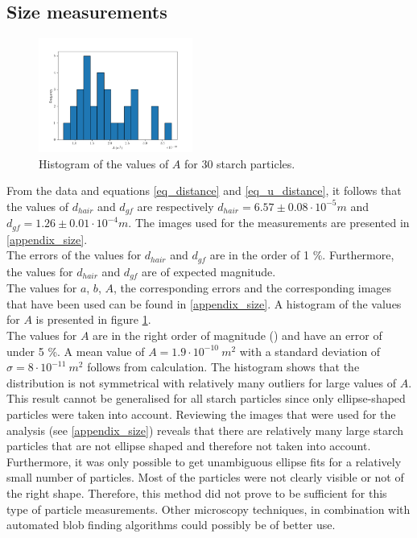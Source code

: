 \subsection{Size measurements}
\begin{figure}
    \centering
    \vspace{-1cm}
    \includegraphics[width=0.45\textwidth,keepaspectratio]{afbeeldingen/histogram_zetmeel.png}
    \caption{Histogram of the values of $A$ for 30 starch particles.}
    \label{fig_histogram_zetmeel}
\end{figure}

From the data and equations \ref{eq_distance} and \ref{eq_u_distance}, it follows that the values of $d_{hair}$ and $d_{gf}$ are respectively $d_{hair} = 6.57 \pm 0.08 \cdot 10^{-5} m $ and $d_{gf} =  1.26 \pm 0.01 \cdot 10^{-4} m $. The images used for the measurements are presented in \ref{appendix_size}.\\
The errors of the values for $d_{hair}$ and $d_{gf}$ are in the order of 1 \%. Furthermore, the values for $d_{hair}$ and $d_{gf}$ are of expected magnitude.\\
The values for $a$, $b$, $A$, the corresponding errors and the corresponding images that have been used can be found in \ref{appendix_size}. A histogram of the values for $A$ is presented in figure \ref{fig_histogram_zetmeel}.\\
The values for $A$ are in the right order of magnitude (\cite{starch}) and have an error of under 5 \%. A mean  value of $A=1.9\cdot10^{-10} \: m^2$ with a standard deviation of $\sigma = 8 \cdot10^{-11} \: m^2$ follows from calculation. The histogram shows that the distribution is not symmetrical with relatively many outliers for large values of $A$. This result cannot be generalised for all starch particles since only ellipse-shaped particles were taken into account. Reviewing the images that were used for the analysis (see \ref{appendix_size}) reveals that there are relatively many large starch particles that are not ellipse shaped and therefore not taken into account. Furthermore, it was only possible to get unambiguous ellipse fits for a relatively small number of particles. Most of the particles were not clearly visible or not of the right shape. Therefore, this method did not prove to be sufficient for this type of particle measurements. Other microscopy techniques, in combination with automated blob finding algorithms could possibly be of better use.\\

